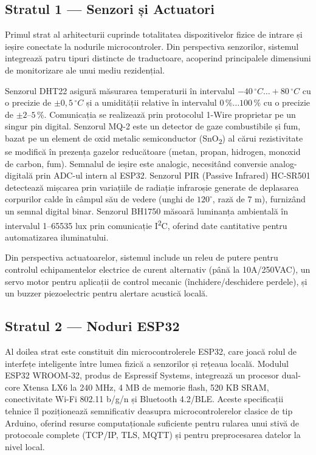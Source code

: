 \documentclass[12pt, twoside, a4paper]{report}
\begin{document}
\subsection{Stratul 1 --- Senzori și Actuatori}

Primul strat al arhitecturii cuprinde totalitatea dispozitivelor fizice de intrare și
ieșire conectate la nodurile microcontroler. Din perspectiva senzorilor, sistemul
integrează patru tipuri distincte de traductoare, acoperind principalele dimensiuni
de monitorizare ale unui mediu rezidențial.

Senzorul DHT22 asigură măsurarea temperaturii în intervalul $-40\,^{\circ}C \ldots +80\,^{\circ}C$
cu o precizie de $\pm 0{,}5\,^{\circ}C$ și a umidității relative în intervalul
$0\,\%\ldots 100\,\%$ cu o precizie de $\pm 2$--$5\,\%$. Comunicația se realizează
prin protocolul 1-Wire proprietar pe un singur pin digital. Senzorul MQ-2 este un
detector de gaze combustibile și fum, bazat pe un element de oxid metalic semiconductor
(SnO\textsubscript{2}) al cărui rezistivitate se modifică în prezența gazelor
reducătoare (metan, propan, hidrogen, monoxid de carbon, fum). Semnalul de ieșire este
analogic, necesitând conversie analog-digitală prin ADC-ul intern al ESP32. Senzorul
PIR (Passive Infrared) HC-SR501 detectează mișcarea prin variațiile de radiație
infraroșie generate de deplasarea corpurilor calde în câmpul său de vedere (unghi de
$120^{\circ}$, rază de 7 m), furnizând un semnal digital binar. Senzorul BH1750
măsoară luminanța ambientală în intervalul 1--65535 lux prin comunicație I\textsuperscript{2}C,
oferind date cantitative pentru automatizarea iluminatului.

Din perspectiva actuatoarelor, sistemul include un releu de putere pentru controlul
echipamentelor electrice de curent alternativ (până la 10A/250VAC), un servo motor
pentru aplicații de control mecanic (închidere/deschidere perdele), și un buzzer
piezoelectric pentru alertare acustică locală.

\subsection{Stratul 2 --- Noduri ESP32}

Al doilea strat este constituit din microcontrolerele ESP32, care joacă rolul de
interfețe inteligente între lumea fizică a senzorilor și rețeaua locală. Modulul
ESP32 WROOM-32, produs de Espressif Systems, integrează un procesor dual-core
Xtensa LX6 la 240 MHz, 4 MB de memorie flash, 520 KB SRAM, conectivitate Wi-Fi
802.11 b/g/n și Bluetooth 4.2/BLE. Aceste specificații tehnice îl poziționează
semnificativ deasupra microcontrolerelor clasice de tip Arduino, oferind resurse
computaționale suficiente pentru rularea unui stivă de protocoale complete (TCP/IP,
TLS, MQTT) și pentru preprocesarea datelor la nivel local.
\end{document}
